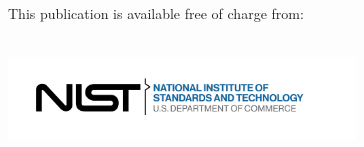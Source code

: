 \newcommand{\zws}{\hspace{0pt}}


\begin{titlepage}
\begin{flushright}
\LARGE{}\\
\LARGE{\sffamily{\textbf{\pubnumber}}}\\
\vfill
\Huge{\sffamily{\textbf{\pubtitle}}}\\
\ifdefined\pubsubtitle
\Large{\sffamily{\textit{\pubsubtitle}}}\\
\fi
    \vfill
\large \authorone\\
\large \authortwo\\
\large \authorthree\\
\large \authorfour\\
\vfill
\normalsize This publication is available free of charge from:\\
\DOI\\
\vfill

\includegraphics[trim=0 0 0.7in 0,clip,width=3.62in]{NIST-logo.png}\\
\end{flushright}
\end{titlepage}

